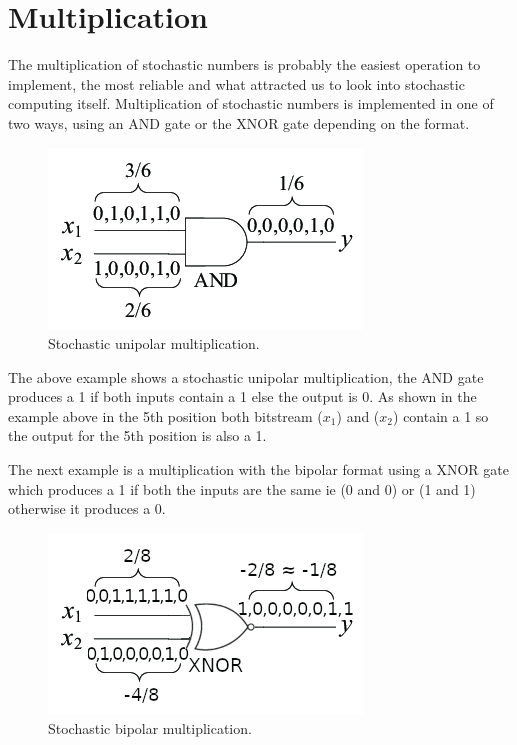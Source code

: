 \documentclass[a4paper,oneside,phd,etd]{BYUPhys}
\begin{document}
\section{Multiplication}
The multiplication of stochastic numbers is probably the easiest operation to implement, the most reliable and what attracted us to look into stochastic computing itself. Multiplication of stochastic numbers is implemented in one of two ways, using an AND gate or the XNOR gate depending on the format.
\begin{figure}[H]
\centering
\includegraphics[scale=2]{pictures/mult.png}
\caption{Stochastic unipolar multiplication\cite{fig:multiplyslashadd}.}
\label{fig:multiplyslashadd}
\end{figure}
The above example shows a stochastic unipolar multiplication, the AND gate produces a 1 if both inputs contain a 1 else the output is 0. As shown in the example above in the 5th position both bitstream ($x_1$) and ($x_2$) contain a 1 so the output for the 5th position is also a 1.

The next example is a multiplication with the bipolar format using a XNOR gate which produces a 1 if both the inputs are the same ie (0 and 0) or (1 and 1) otherwise it produces a 0.
\begin{figure}[H]
\centering
\includegraphics[scale=2]{pictures/mult_xnor.png}
\caption{Stochastic bipolar multiplication.}
\label{fig:multiplyslashaddbi}
\end{figure}
\end{document}
